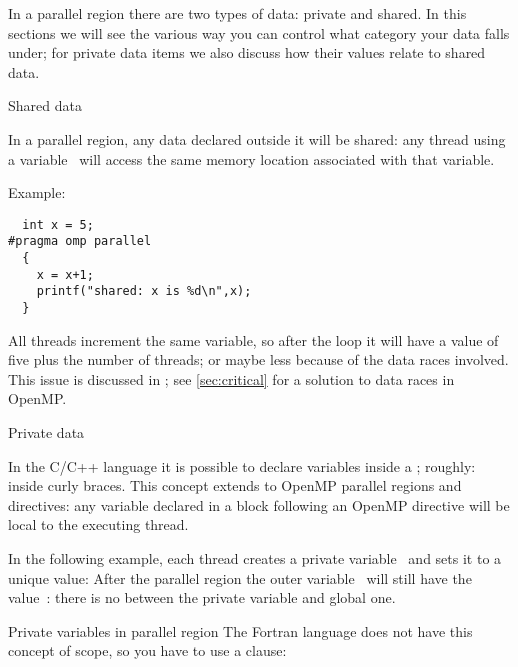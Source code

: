 
\label{sec:ompdata}

In a parallel region there are two types of data: private and shared.
In this sections we will see the various way you can control what category
your data falls under; for private data items we also discuss how their values
relate to shared data.

 {Shared data}

In a parallel region, any data declared outside it will be shared:
any thread using a variable~ will access the same memory location
associated with that variable.

Example:
\begin{lstlisting}
  int x = 5;
#pragma omp parallel
  {
    x = x+1;
    printf("shared: x is %d\n",x);
  }
\end{lstlisting}
All threads increment the same variable, so after the loop it will
have a value of five plus the number of threads;
or maybe less because of the data races involved.
This issue is discussed in ;
see \ref{sec:critical} for a solution to data races in OpenMP.

 {Private data}
\label{sec:omp-private}

In the C/C++ language it is possible to declare variables inside
a ; roughly: inside curly braces.
This concept extends to OpenMP parallel regions and directives:
any variable declared in a block following an OpenMP directive
will be local to the executing thread.

In the following example, each thread creates a private variable~
and sets it to a unique value:
%
%
After the parallel region the outer variable~ will still have the
value~: there is no  between the
private variable and global one.

\begin{fortrannote}{Private variables in parallel region}
  The Fortran language does not have this concept of scope, so you have to use a
   clause:
\end{fortrannote}

